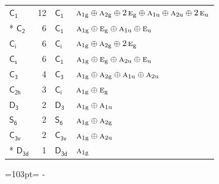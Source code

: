 \documentclass[10pt,a4paper]{article}
\newcommand{\needspace}[1]{\par\penalty-100\begingroup\dimen0=#1\relax\dimen2=\pagegoal
  \advance\dimen2-\pagetotal\ifdim\dimen0>\dimen2\relax\ifdim\dimen2>0pt\vfil\break\fi\fi
  \endgroup}
\numberwithin{equation}{section}
\newcommand{\grp}[1]{\mathsf{#1}}
\newcommand{\irr}[1]{\text{\normalfont\scshape #1}}
\newcommand{\ptag}[1]{\mathrm{#1}}
\newlength{\fillwidth}\newlength{\cellwidth}\newlength{\colwidth}
\begin{document}
{\begin{longtable}{@{}lrl>{\RaggedRight\arraybackslash}p{\fillwidth}@{}}
\bottomrule\endfoot\endlastfoot
\href{C1.pdf}{$\grp{C_{1}}$} & 12 & \href{C1.pdf}{$\grp{C_{1}}$} & $\irr{a}_{1\ptag{g}}\oplus \irr{a}_{2\ptag{g}}\oplus 2\,\irr{e}_{\ptag{g}}\oplus \irr{a}_{1\ptag{u}}\oplus \irr{a}_{2\ptag{u}}\oplus 2\,\irr{e}_{\ptag{u}}$\\*
\href{C2.pdf}{$\grp{C_{2}}$} & 6 & \href{C1.pdf}{$\grp{C_{1}}$} & $\irr{a}_{1\ptag{g}}\oplus \irr{e}_{\ptag{g}}\oplus \irr{a}_{1\ptag{u}}\oplus \irr{e}_{\ptag{u}}$\\
\href{S2.pdf}{$\grp{C_{i}}$} & 6 & \href{S2.pdf}{$\grp{C_{i}}$} & $\irr{a}_{1\ptag{g}}\oplus \irr{a}_{2\ptag{g}}\oplus 2\,\irr{e}_{\ptag{g}}$\\
\href{C1v.pdf}{$\grp{C_{s}}$} & 6 & \href{C1.pdf}{$\grp{C_{1}}$} & $\irr{a}_{1\ptag{g}}\oplus \irr{e}_{\ptag{g}}\oplus \irr{a}_{2\ptag{u}}\oplus \irr{e}_{\ptag{u}}$\\
\href{C3.pdf}{$\grp{C_{3}}$} & 4 & \href{C3.pdf}{$\grp{C_{3}}$} & $\irr{a}_{1\ptag{g}}\oplus \irr{a}_{2\ptag{g}}\oplus \irr{a}_{1\ptag{u}}\oplus \irr{a}_{2\ptag{u}}$\\
\href{C2h.pdf}{$\grp{C_{2h}}$} & 3 & \href{S2.pdf}{$\grp{C_{i}}$} & $\irr{a}_{1\ptag{g}}\oplus \irr{e}_{\ptag{g}}$\\
\href{D3.pdf}{$\grp{D_{3}}$} & 2 & \href{D3.pdf}{$\grp{D_{3}}$} & $\irr{a}_{1\ptag{g}}\oplus \irr{a}_{1\ptag{u}}$\\
\href{S6.pdf}{$\grp{S_{6}}$} & 2 & \href{S6.pdf}{$\grp{S_{6}}$} & $\irr{a}_{1\ptag{g}}\oplus \irr{a}_{2\ptag{g}}$\\
\href{C3v.pdf}{$\grp{C_{3v}}$} & 2 & \href{C3v.pdf}{$\grp{C_{3v}}$} & $\irr{a}_{1\ptag{g}}\oplus \irr{a}_{2\ptag{u}}$\\*
\href{D3d.pdf}{$\grp{D_{3d}}$} & 1 & \href{D3d.pdf}{$\grp{D_{3d}}$} & $\irr{a}_{1\ptag{g}}$\\
\bottomrule\end{longtable}}
\needspace{103pt}
\end{document}
